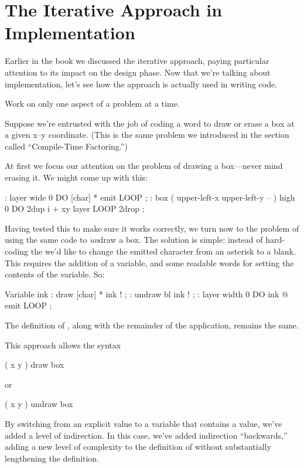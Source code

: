 \section{The Iterative Approach in Implementation}
Earlier in the book we discussed the iterative approach, paying
particular attention to its impact on the design phase. Now that we're
talking about implementation, let's see how the approach is actually
used in writing code.

\begin{tip}
Work on only one aspect of a problem at a time.
\end{tip}
Suppose we're entrusted with the job of coding a word to draw or erase
a box at a given x--y coordinate. (This is the same problem we
introduced in the section called ``Compile-Time Factoring.'')

At first we focus our attention on the problem of drawing a
box---never mind erasing it. We might come up with this:

\begin{Code}
: layer   wide  0 DO  [char] * emit  LOOP ;
: box   ( upper-left-x  upper-left-y -- )
   high  0 DO  2dup  i +  xy layer  LOOP  2drop ;
\end{Code}
Having tested this to make sure it works correctly, we turn now to the
problem of using the same code to \emph{un}draw a box. The solution is
simple: instead of hard-coding the \forthb{[CHAR] *} we'd like to change
the emitted character from an asterisk to a blank. This requires the
addition of a variable, and some readable words for setting the
contents of the variable. So:

\begin{Code}
Variable ink
: draw   [char] *  ink ! ;
: undraw   bl  ink ! ;
: layer   width  0 DO  ink @  emit  LOOP ;
\end{Code}
The definition of , along with the remainder of the application,
remains the same.

This approach allows the syntax

\begin{Code}
( x y ) draw box
\end{Code}
or

\begin{Code}
( x y ) undraw box
\end{Code}
By switching from an explicit value to a variable that contains a
value, we've added a level of indirection. In this case, we've added
indirection ``backwards,'' adding a new level of complexity to the
definition of  without substantially lengthening the definition.

